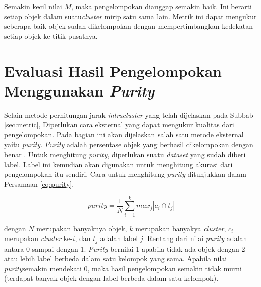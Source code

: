 Semakin kecil nilai $M$, maka pengelompokan dianggap semakin baik. Ini berarti setiap objek dalam suatu\textit{cluster} mirip satu sama lain. Metrik ini dapat mengukur seberapa baik objek sudah dikelompokan dengan mempertimbangkan kedekatan setiap objek ke titik pusatnya.

\section{Evaluasi Hasil Pengelompokan Menggunakan \textit{Purity}}
Selain metode perhitungan jarak \textit{intracluster} yang telah dijelaskan pada Subbab \ref{sec:metric}, Diperlukan cara eksternal yang dapat mengukur kualitas dari pengelompokan. Pada bagian ini akan dijelaskan salah satu metode eksternal yaitu \textit{purity}. \textit{Purity} adalah persentase objek yang berhasil dikelompokan dengan benar \cite{schutze2008introduction}. Untuk menghitung \textit{purity}, diperlukan suatu \textit{dataset} yang sudah diberi label. Label ini kemudian akan digunakan untuk menghitung akurasi dari pengelompokan itu sendiri. Cara untuk menghitung \textit{purity} ditunjukkan dalam Persamaan \ref{eq:purity}.

\begin{equation}
	\label{eq:purity}
	purity=\frac{1}{N}\sum^k_{i=1} max_j |c_i \cap t_j|
\end{equation}

dengan $N$ merupakan banyaknya objek, $k$ merupakan banyakya \textit{cluster}, $c_i$ merupakan \textit{cluster} ke-$i$, dan $t_j$ adalah label $j$. Rentang dari nilai \textit{purity} adalah antara 0 sampai dengan 1. \textit{Purity} bernilai 1 apabila tidak ada objek dengan 2 atau lebih label berbeda dalam satu kelompok yang sama. Apabila nilai \textit{purity}semakin mendekati 0, maka hasil pengelompokan semakin tidak murni (terdapat banyak objek dengan label berbeda dalam satu kelompok).
